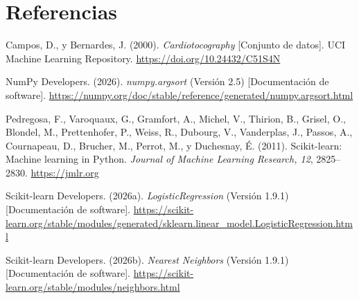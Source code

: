 \documentclass[10pt,letterpaper,twocolumn]{article}
\begin{document}
\balance
\section{Referencias}
\begingroup
\scriptsize
\setlength{\parindent}{0pt}
\setlength{\parskip}{1pt}
\noindent\hangindent=1.1cm
Campos, D., y Bernardes, J. (2000). \textit{Cardiotocography} [Conjunto de datos]. UCI Machine Learning Repository. \url{https://doi.org/10.24432/C51S4N}

\noindent\hangindent=1.1cm
NumPy Developers. (2026). \textit{numpy.argsort} (Versión 2.5) [Documentación de software]. \url{https://numpy.org/doc/stable/reference/generated/numpy.argsort.html}

\noindent\hangindent=1.1cm
Pedregosa, F., Varoquaux, G., Gramfort, A., Michel, V., Thirion, B., Grisel, O., Blondel, M., Prettenhofer, P., Weiss, R., Dubourg, V., Vanderplas, J., Passos, A., Cournapeau, D., Brucher, M., Perrot, M., y Duchesnay, É. (2011). Scikit-learn: Machine learning in Python. \textit{Journal of Machine Learning Research, 12}, 2825--2830. \url{https://jmlr.org}

\noindent\hangindent=1.1cm
Scikit-learn Developers. (2026a). \textit{LogisticRegression} (Versión 1.9.1) [Documentación de software]. \url{https://scikit-learn.org/stable/modules/generated/sklearn.linear_model.LogisticRegression.html}

\noindent\hangindent=1.1cm
Scikit-learn Developers. (2026b). \textit{Nearest Neighbors} (Versión 1.9.1) [Documentación de software]. \url{https://scikit-learn.org/stable/modules/neighbors.html}

\endgroup
\end{document}
